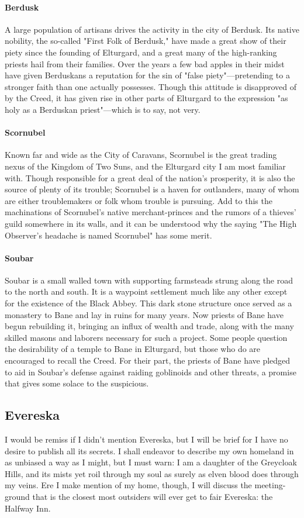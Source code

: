 \documentclass[10pt,a4paper,twoside,twocolumn,openany,bg=print,nodeprecatedcode]{dndbook}
\begin{document}
\paragraph{Berdusk}
A large population of artisans drives the activity in the city of Berdusk. Its native nobility, the so-called "First Folk of Berdusk," have made a great show of their piety since the founding of Elturgard, and a great many of the high-ranking priests hail from their families. Over the years a few bad apples in their midst have given Berduskans a reputation for the sin of "false piety"—pretending to a stronger faith than one actually possesses. Though this attitude is disapproved of by the Creed, it has given rise in other parts of Elturgard to the expression "as holy as a Berduskan priest"—which is to say, not very.
\paragraph{Scornubel}
Known far and wide as the City of Caravans, Scornubel is the great trading nexus of the Kingdom of Two Suns, and the Elturgard city I am most familiar with. Though responsible for a great deal of the nation's prosperity, it is also the source of plenty of its trouble; Scornubel is a haven for outlanders, many of whom are either troublemakers or folk whom trouble is pursuing. Add to this the machinations of Scornubel's native merchant-princes and the rumors of a thieves' guild somewhere in its walls, and it can be understood why the saying "The High Observer's headache is named Scornubel" has some merit.
\paragraph{Soubar}
Soubar is a small walled town with supporting farmsteads strung along the road to the north and south. It is a waypoint settlement much like any other except for the existence of the Black Abbey. This dark stone structure once served as a monastery to Bane and lay in ruins for many years. Now priests of Bane have begun rebuilding it, bringing an influx of wealth and trade, along with the many skilled masons and laborers necessary for such a project. Some people question the desirability of a temple to Bane in Elturgard, but those who do are encouraged to recall the Creed. For their part, the priests of Bane have pledged to aid in Soubar's defense against raiding goblinoids and other threats, a promise that gives some solace to the suspicious.
\subsection{Evereska}
I would be remiss if I didn't mention Evereska, but I will be brief for I have no desire to publish all its secrets. I shall endeavor to describe my own homeland in as unbiased a way as I might, but I must warn: I am a daughter of the Greycloak Hills, and its mists yet roil through my soul as surely as elven blood does through my veins. Ere I make mention of my home, though, I will discuss the meeting-ground that is the closest most outsiders will ever get to fair Evereska: the Halfway Inn.
\end{document}
